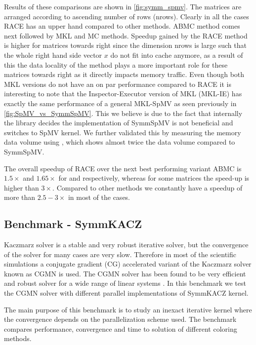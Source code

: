 Results of these comparisons are shown in \cref{fig:symm_spmv}. The matrices are arranged according to ascending number of rows (\acrshort{nrows}). Clearly in all the cases \acrshort{RACE} has an upper hand compared to other methods. \acrshort{ABMC} method comes next followed by \acrshort{MKL} and \acrshort{MC} methods. Speedup gained by the \acrshort{RACE} method is higher for matrices towards right since the dimension \acrshort{nrows} is large such that the whole right hand side vector $x$ do not fit into cache anymore, as a result of this the data locality of the method plays a more important role for these matrices towards right as it directly impacts memory traffic. Even though both \acrshort{MKL} versions do not have an on par performance compared to \acrshort{RACE} it is interesting to note that the Inspector-Executor version of \acrshort{MKL} (MKL-IE) has exactly the same performance of a general MKL-\acrshort{SpMV} as seen previously in \cref{fig:SpMV_vs_SymmSpMV}. This we believe is due to the fact that internally the library decides the implementation of \acrshort{SymmSpMV}  is not beneficial and switches to \acrshort{SpMV} kernel. We further validated this by measuring the memory data volume using \LIKWID, which shows almost twice the data volume compared to \acrshort{SymmSpMV}.

The overall speedup of \acrshort{RACE} over the next best performing variant \acrshort{ABMC} is $1.5\times$ and $1.65 \times$ for \IVB and \SKX respectively, whereas for some matrices the speed-up is higher than $3 \times$. Compared to other methods we constantly have a speedup of more than $2.5 - 3 \times$ in most of the cases. 

\subsection{Benchmark - \acrshort{SymmKACZ}}
Kaczmarz solver is a stable and very robust iterative solver, but the convergence of the solver for many cases are very slow. Therefore in most of the scientific simulations a conjugate gradient (CG) accelerated variant of the Kaczmarz solver known as CGMN \cite{CGMN} is used. The CGMN solver has been found to be very efficient and robust solver for a wide range of linear systems \cite{CGMN_gordon}. In this benchmark we test the CGMN solver with different parallel implementations of \acrshort{SymmKACZ} kernel. 

The main purpose of this benchmark is to study an inexact iterative kernel where the convergence depends on the parallelization scheme used. The benchmark compares performance, convergence and time to solution of different coloring methods.

